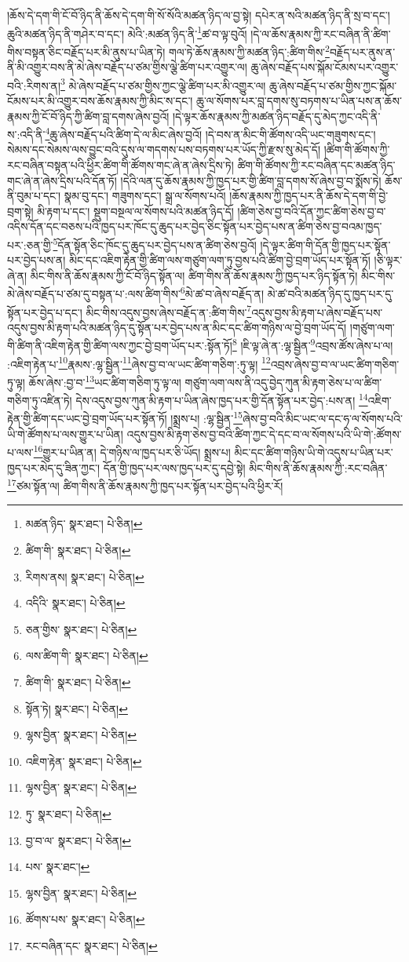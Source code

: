།ཆོས་དེ་དག་གི་ངོ་བོ་ཉིད་ནི་ཆོས་དེ་དག་གི་སོ་སོའི་མཚན་ཉིད་ལ་བྱ་སྟེ། དཔེར་ན་སའི་མཚན་ཉིད་ནི་སྲ་བ་དང་། ཆུའི་མཚན་ཉིད་ནི་གཤེར་བ་དང་། མེའི་:མཚན་ཉིད་ནི་\footnote{མཚན་ཉིད་  སྣར་ཐང་།  པེ་ཅིན། }ཚ་བ་ལྟ་བུའོ། །དེ་ལ་ཆོས་རྣམས་ཀྱི་རང་བཞིན་ནི་ཚིག་གིས་བསྟན་ཅིང་བརྗོད་པར་མི་ནུས་པ་ཡིན་ཏེ། གལ་ཏེ་ཆོས་རྣམས་ཀྱི་མཚན་ཉིད་:ཚིག་གིས་\footnote{ཚིག་གི་  སྣར་ཐང་།  པེ་ཅིན། }བརྗོད་པར་ནུས་ན་ནི་མི་འགྱུར་བས་ནི་མེ་ཞེས་བརྗོད་པ་ཙམ་གྱིས་ལྕེ་ཚིག་པར་འགྱུར་ལ། ཆུ་ཞེས་བརྗོད་པས་སྐོམ་ངོམས་པར་འགྱུར་བའི་:རིགས་ན།\footnote{རིགས་ནས།  སྣར་ཐང་།  པེ་ཅིན། } མེ་ཞེས་བརྗོད་པ་ཙམ་གྱིས་ཀྱང་ལྕེ་ཚིག་པར་མི་འགྱུར་ལ། ཆུ་ཞེས་བརྗོད་པ་ཙམ་གྱིས་ཀྱང་སྐོམ་ངོམས་པར་མི་འགྱུར་བས་ཆོས་རྣམས་ཀྱི་མིང་ས་དང་། ཆུ་ལ་སོགས་པར་བླ་དགས་སུ་བཏགས་པ་ཡིན་པས་ན་ཆོས་རྣམས་ཀྱི་ངོ་བོ་ཉིད་ཀྱི་ཚིག་བླ་དགས་ཞེས་བྱའོ། །དེ་ལྟར་ཆོས་རྣམས་ཀྱི་མཚན་ཉིད་བརྗོད་དུ་མེད་ཀྱང་འདི་ནི་ས་:འདི་ནི་\footnote{འདིའི་  སྣར་ཐང་།  པེ་ཅིན། }ཆུ་ཞེས་བརྗོད་པའི་ཚིག་དེ་ལ་མིང་ཞེས་བྱའོ། །དེ་བས་ན་མིང་གི་ཚོགས་འདི་ཡང་གཟུགས་དང་། སེམས་དང་སེམས་ལས་བྱུང་བའི་དུས་ལ་གདགས་པས་བཏགས་པར་ཡོད་ཀྱི་རྫས་སུ་མེད་དོ། །ཚིག་གི་ཚོགས་ཀྱི་རང་བཞིན་བསྟན་པའི་ཕྱིར་ཚིག་གི་ཚོགས་གང་ཞེ་ན་ཞེས་དྲིས་ཏེ། ཚིག་གི་ཚོགས་ཀྱི་རང་བཞིན་དང་མཚན་ཉིད་གང་ཞེ་ན་ཞེས་དྲིས་པའི་དོན་ཏོ། །དེའི་ལན་དུ་ཆོས་རྣམས་ཀྱི་ཁྱད་པར་གྱི་ཚིག་བླ་དགས་སོ་ཞེས་བྱ་བ་སྨོས་ཏེ། ཆོས་ནི་བུམ་པ་དང་། སྣམ་བུ་དང་། གཟུགས་དང་། སྒྲ་ལ་སོགས་པའོ། །ཆོས་རྣམས་ཀྱི་ཁྱད་པར་ནི་ཆོས་དེ་དག་གི་བྱེ་བྲག་སྟེ། མི་རྟག་པ་དང་། སྡུག་བསྔལ་ལ་སོགས་པའི་མཚན་ཉིད་དོ། །ཚིག་ཅེས་བྱ་བའི་དོན་ཀྱང་ཚིག་ཅེས་བྱ་བ་འདིས་དོན་དང་བཅས་པའི་ཁྱད་པར་ཁོང་དུ་ཆུད་པར་བྱེད་ཅིང་སྟོན་པར་བྱེད་པས་ན་ཚིག་ཅེས་བྱ་བའམ་ཁྱད་པར་:ཅན་གྱི་\footnote{ཅན་གྱིས་  སྣར་ཐང་།  པེ་ཅིན། }དོན་སྟོན་ཅིང་ཁོང་དུ་ཆུད་པར་བྱེད་པས་ན་ཚིག་ཅེས་བྱའོ། །དེ་ལྟར་ཚིག་གི་དོན་གྱི་ཁྱད་པར་སྟོན་པར་བྱེད་པས་ན། མིང་དང་འཇིག་རྟེན་གྱི་ཚིག་ལས་གཙུག་ལག་ཏུ་བྱས་པའི་ཚིག་བྱེ་བྲག་ཡོད་པར་སྟོན་ཏོ། །ཅི་ལྟར་ཞེ་ན། མིང་གིས་ནི་ཆོས་རྣམས་ཀྱི་ངོ་བོ་ཉིད་སྟོན་ལ། ཚིག་གིས་ནི་ཆོས་རྣམས་ཀྱི་ཁྱད་པར་ཉིད་སྟོན་ཏེ། མིང་གིས་མེ་ཞེས་བརྗོད་པ་ཙམ་དུ་བསྟན་པ་:ལས་ཚིག་གིས་\footnote{ལས་ཚིག་གི་  སྣར་ཐང་།  པེ་ཅིན། }མེ་ཚ་བ་ཞེས་བརྗོད་ན། མེ་ཚ་བའི་མཚན་ཉིད་དུ་ཁྱད་པར་དུ་སྟོན་པར་བྱེད་པ་དང་། མིང་གིས་འདུས་བྱས་ཞེས་བརྗོད་ན་:ཚིག་གིས་\footnote{ཚིག་གི་  སྣར་ཐང་།  པེ་ཅིན། }འདུས་བྱས་མི་རྟག་པ་ཞེས་བརྗོད་པས་འདུས་བྱས་མི་རྟག་པའི་མཚན་ཉིད་དུ་སྟོན་པར་བྱེད་པས་ན་མིང་དང་ཚིག་གཉིས་ལ་བྱེ་བྲག་ཡོད་དོ། །གཙུག་ལག་གི་ཚིག་ནི་འཇིག་རྟེན་གྱི་ཚིག་ལས་ཀྱང་བྱེ་བྲག་ཡོད་པར་:སྟོན་ཏོ།\footnote{སྟོན་ཏེ།  སྣར་ཐང་།  པེ་ཅིན། } །ཇི་ལྟ་ཞེ་ན་:ལྷ་སྦྱིན་\footnote{ལྷས་བྱིན་  སྣར་ཐང་།  པེ་ཅིན། }འབྲས་ཚོས་ཞེས་པ་ལ། :འཇིག་རྟེན་པ་\footnote{འཇིག་རྟེན་  སྣར་ཐང་།  པེ་ཅིན། }རྣམས་:ལྷ་སྦྱིན་\footnote{ལྷས་བྱིན་  སྣར་ཐང་།  པེ་ཅིན། }ཞེས་བྱ་བ་ལ་ཡང་ཚིག་གཅིག་:ཏུ་ལྟ། \footnote{ཏུ་  སྣར་ཐང་།  པེ་ཅིན། }འབྲས་ཞེས་བྱ་བ་ལ་ཡང་ཚིག་གཅིག་ཏུ་ལྟ། ཆོས་ཞེས་:བྱ་བ་\footnote{བྱ་བ་ལ་  སྣར་ཐང་།  པེ་ཅིན། }ཡང་ཚིག་གཅིག་ཏུ་ལྟ་ལ། གཙུག་ལག་ལས་ནི་འདུ་བྱེད་ཀུན་མི་རྟག་ཅེས་པ་ལ་ཚིག་གཅིག་ཏུ་འཛིན་ཏེ། དེས་འདུས་བྱས་ཀུན་མི་རྟག་པ་ཡིན་ཞེས་ཁྱད་པར་གྱི་དོན་སྟོན་པར་བྱེད་:པས་ན། \footnote{པས་  སྣར་ཐང་། }འཇིག་རྟེན་གྱི་ཚིག་དང་ཡང་བྱེ་བྲག་ཡོད་པར་སྟོན་ཏོ། །སྨྲས་པ། :ལྷ་སྦྱིན་\footnote{ལྷས་བྱིན་  སྣར་ཐང་།  པེ་ཅིན། }ཞེས་བྱ་བའི་མིང་ཡང་ལ་དང་ཧ་ལ་སོགས་པའི་ཡི་གེ་ཚོགས་པ་ལས་གྱུར་པ་ཡིན། འདུས་བྱས་མི་རྟག་ཅེས་བྱ་བའི་ཚིག་ཀྱང་དེ་དང་བ་ལ་སོགས་པའི་ཡི་གེ་:ཚོགས་པ་ལས་\footnote{ཚོགས་པས་  སྣར་ཐང་།  པེ་ཅིན། }གྱུར་པ་ཡིན་ན། དེ་གཉིས་ལ་ཁྱད་པར་ཅི་ཡོད། སྨྲས་པ། མིང་དང་ཚིག་གཉིས་ཡི་གེ་འདུས་པ་ཡིན་པར་ཁྱད་པར་མེད་དུ་ཟིན་ཀྱང་། དོན་གྱི་ཁྱད་པར་ལས་ཁྱད་པར་དུ་དབྱེ་སྟེ། མིང་གིས་ནི་ཆོས་རྣམས་ཀྱི་:རང་བཞིན་\footnote{རང་བཞིན་དང་  སྣར་ཐང་།  པེ་ཅིན། }ཙམ་སྟོན་ལ། ཚིག་གིས་ནི་ཆོས་རྣམས་ཀྱི་ཁྱད་པར་སྟོན་པར་བྱེད་པའི་ཕྱིར་རོ། 